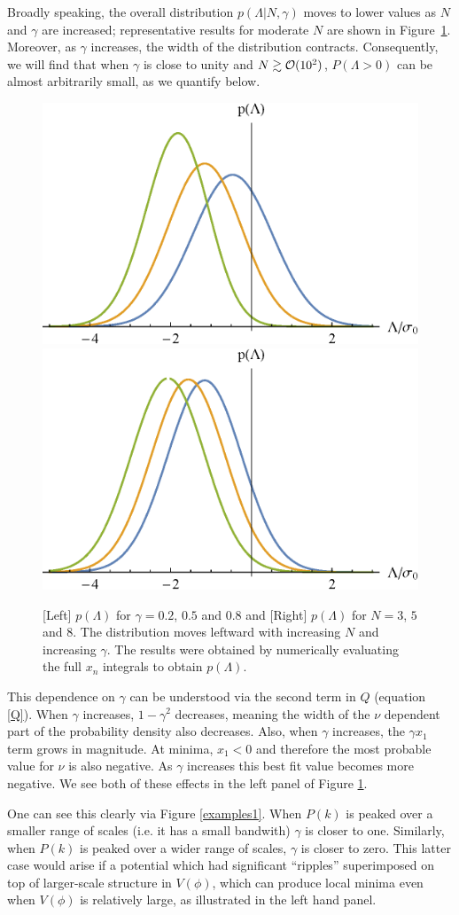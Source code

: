 \documentclass[12pt]{article}
\begin{document}
Broadly speaking, the overall distribution $p(\Lambda | N,\gamma)$ moves to lower values as $N$ and $\gamma$ are increased;  representative results for moderate $N$ are shown in Figure~\ref{distributions}. Moreover, as $\gamma$ increases, the width of the distribution contracts. Consequently, we will find that when $\gamma$ is close to unity and $N \gtrsim {\cal{O}}(10^2)$, $P(\Lambda >0)$ can be almost arbitrarily small, as we quantify below. 


\begin{figure}
  \centering
  \includegraphics[width=0.45 \linewidth]{PLam_gamma.eps}  \hfill
  \includegraphics[width=0.45 \linewidth]{PLam_N.eps}
  \caption{[Left] $p(\Lambda)$ for $\gamma = 0.2$, $0.5$ and $0.8$ and [Right] $p(\Lambda)$ for $N=3$, $5$ and $8$. The distribution moves leftward with increasing $N$ and increasing $\gamma$. The results were obtained by numerically evaluating the full $x_n$ integrals to obtain $p(\Lambda)$.}
  \label{distributions}
  \end{figure}

This dependence on $\gamma$ can be understood via the second term in $Q$ (equation \eqref{Q}). When $\gamma$ increases, $1-\gamma^2$ decreases, meaning the width of the $\nu$ dependent part of the probability density also decreases. Also, when $\gamma$ increases, the $\gamma x_1$ term grows in magnitude. At minima, $x_1 <0$ and therefore the most probable value for $\nu$ is also negative. As $\gamma$ increases this best fit value becomes more negative. We see both of these effects in the left panel of Figure \ref{distributions}.

One can see this clearly via Figure \ref{examples1}. When $P(k)$ is peaked over a smaller range of scales (i.e. it has a small bandwith) $\gamma$ is closer to one. Similarly, when $P(k)$ is peaked over a wider range of scales, $\gamma$ is closer to zero. This latter case would arise if a potential which had  significant ``ripples'' superimposed on top of larger-scale structure in $V(\phi)$, which can produce local minima even when $V(\phi)$ is relatively large, as illustrated in the left hand panel.
\end{document}
